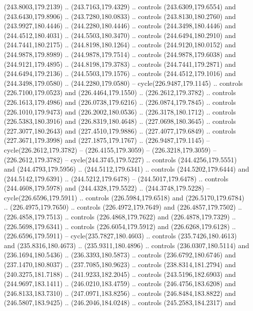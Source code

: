 \begin{scope}[cm={{1.25,0.0,0.0,-1.25,(0.0,442.91375)}}]
    (243.8003,179.2139) .. (243.7163,179.4329) .. controls (243.6309,179.6554) and
    (243.6430,179.8906) .. (243.7280,180.0833) .. controls (243.8130,180.2760) and
    (243.9927,180.4446) .. (244.2280,180.4446) .. controls (244.3498,180.4446) and
    (244.4512,180.4031) .. (244.5503,180.3470) .. controls (244.6494,180.2910) and
    (244.7441,180.2175) .. (244.8198,180.1264) .. controls (244.9120,180.0152) and
    (244.9878,179.8989) .. (244.9878,179.7514) .. controls (244.9878,179.6038) and
    (244.9121,179.4895) .. (244.8198,179.3783) .. controls (244.7441,179.2871) and
    (244.6494,179.2136) .. (244.5503,179.1576) .. controls (244.4512,179.1016) and
    (244.3498,179.0580) .. (244.2280,179.0580) -- cycle(226.9487,179.1145) ..
    controls (226.7100,179.0523) and (226.4464,179.1550) .. (226.2612,179.3782) ..
    controls (226.1613,179.4986) and (226.0738,179.6216) .. (226.0874,179.7845) ..
    controls (226.1010,179.9473) and (226.2002,180.0536) .. (226.3178,180.1712) ..
    controls (226.5383,180.3916) and (226.8319,180.4648) .. (227.0698,180.3645) ..
    controls (227.3077,180.2643) and (227.4510,179.9886) .. (227.4077,179.6849) ..
    controls (227.3671,179.3998) and (227.1875,179.1767) .. (226.9487,179.1145) --
    cycle(226.2612,179.3782) -- (226.4155,179.3059) -- (226.3218,179.3059) --
    (226.2612,179.3782) -- cycle(244.3745,179.5227) .. controls
    (244.4256,179.5551) and (244.4793,179.5956) .. (244.5112,179.6341) .. controls
    (244.5202,179.6444) and (244.5142,179.6391) .. (244.5212,179.6478) --
    (244.5017,179.6478) .. controls (244.4608,179.5978) and (244.4328,179.5522) ..
    (244.3748,179.5228) -- cycle(226.6596,179.5911) .. controls
    (226.5984,179.6518) and (226.5170,179.6784) .. (226.4975,179.7650) .. controls
    (226.4972,179.7649) and (226.4857,179.7502) .. (226.4858,179.7513) .. controls
    (226.4868,179.7622) and (226.4878,179.7329) .. (226.5698,179.6341) .. controls
    (226.6054,179.5912) and (226.6268,179.6128) .. (226.6596,179.5911) --
    cycle(235.7827,180.4603) .. controls (235.7426,180.4613) and
    (235.8316,180.4673) .. (235.9311,180.4896) .. controls (236.0307,180.5114) and
    (236.1694,180.5436) .. (236.3393,180.5873) .. controls (236.6792,180.6746) and
    (237.1470,180.8037) .. (237.7085,180.9623) .. controls (238.8314,181.2794) and
    (240.3275,181.7188) .. (241.9233,182.2045) .. controls (243.5196,182.6903) and
    (244.9697,183.1411) .. (246.0210,183.4759) .. controls (246.4756,183.6208) and
    (246.8133,183.7310) .. (247.0971,183.8256) .. controls (246.8484,183.8822) and
    (246.5807,183.9425) .. (246.2046,184.0248) .. controls (245.2583,184.2317) and

\end{scope}

